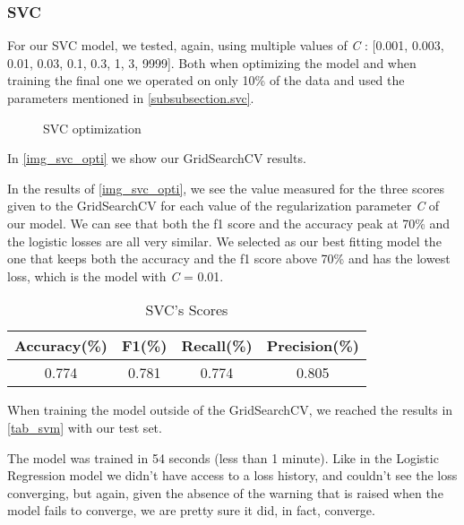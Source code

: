 \documentclass[12pt]{article}
\begin{document}
\subsubsection{SVC}
\label{subsubsection.svc_tunning}
        \par 
        For our SVC model, we tested, again, using multiple values of \textit{C} : [0.001, 0.003, 0.01, 0.03, 0.1, 0.3, 1, 3, 9999].
        Both when optimizing the model and when training the final one we operated on only 10\% of the data and used the parameters mentioned in \autoref{subsubsection.svc}.
    \begin{figure}[!htb]
        \caption{SVC optimization}
        \label{img_svc_opti}
    \end{figure}
        In \autoref{img_svc_opti} we show our GridSearchCV results.
    \par 
        In the results of \autoref{img_svc_opti}, we see the value measured for the three scores given to the GridSearchCV for each value of 
        the regularization parameter \textit{C} of our model. We can see that both the f1 score and the accuracy peak at 70\% and the logistic losses are all 
        very similar. We selected as our best fitting model the one that keeps both the accuracy and the f1 score above 70\% and has the lowest loss, which 
        is the model with \textit{C} = 0.01.
    \begin{center}
        \begin{table}[!h]
        \caption{SVC's Scores}
        \begin{center}
        \begin{tabular}{|c |c |c |c|}
            \hline
            Accuracy(\%) & F1(\%) & Recall(\%) & Precision(\%) \\ [0.5ex] 
            \hline
            0.774 & 0.781 & 0.774 & 0.805 \\ 
            \hline
        \end{tabular}
        \label{tab_svm}
        \end{center}
        \end{table}
    \end{center}
    \par 
        When training the model outside of the GridSearchCV, we reached the results in \autoref{tab_svm} with our test set.
    \par 
        The model was trained in 54 seconds (less than 1 minute).
        Like in the Logistic Regression model we didn't have access to a loss history, and couldn't see the loss converging, but again, given the absence 
        of the warning that is raised when the model fails to converge, we are pretty sure it did, in fact, converge.
    
\end{document}
